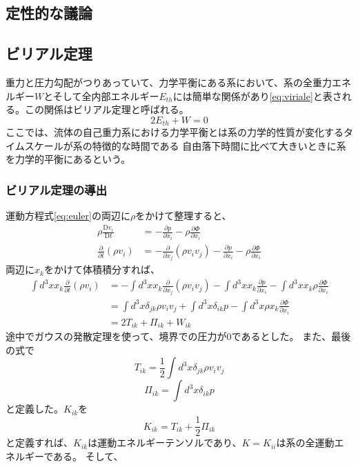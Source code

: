 \documentclass[a4j, dvipdfmx]{jsarticle}
\newcommand{\pder}[2][]{\frac{\partial#1}{\partial#2}}
\newcommand{\Dder}[2][]{\frac{\mathrm{D}#1}{\mathrm{D}#2}}
\newcommand{\half}{\frac{1}{2}}
\newcommand{\beq}{\begin{equation}}
\newcommand{\eeq}{\end{equation}}
\begin{document}
\subsection{定性的な議論}
\subsection{ビリアル定理}
重力と圧力勾配がつりあっていて、力学平衡にある系において、系の全重力エネルギー$W$とそして全内部エネルギー$E_{th}$には簡単な関係があり\eqref{eq:viriale}と表される。この関係はビリアル定理と呼ばれる。
\begin{equation}
    2E_{th} + W = 0\label{eq:viriale}
\end{equation}
ここでは、流体の自己重力系における力学平衡とは系の力学的性質が変化するタイムスケールが系の特徴的な時間である
自由落下時間に比べて大きいときに系を力学的平衡にあるという。
\subsubsection{ビリアル定理の導出}
運動方程式\eqref{eq:euler}の両辺に$\rho$をかけて整理すると、
\begin{align}
    \rho\Dder[v_i]{t} &= - \pder[p]{x_i} - \rho\pder[\Phi]{x_i}\\
    \pder[]{t}(\rho v_i) &= - \pder[]{x_j}(\rho v_iv_j) - \pder[p]{x_i} - \rho\pder[\Phi]{x_i}
\end{align}
両辺に$x_k$をかけて体積積分すれば、
\begin{align}
    \int d^3x x_k \pder[]{t}(\rho v_i) &= - \int d^3x x_k\pder[]{x_j}(\rho v_iv_j) - \int d^3x x_k\pder[p]{x_i} - \int d^3x x_k\rho\pder[\Phi]{x_i}\\
                                       &=  \int d^3x \delta_{jk}\rho v_iv_j + \int d^3x \delta_{ik}p - \int d^3x \rho x_k\pder[\Phi]{x_i}\label{eq:pzero}\\
                                       &= 2T_{ik} + \Pi_{ik} + W_{ik}
\end{align}
途中でガウスの発散定理を使って、境界での圧力が$0$であるとした。
また、最後の式で
\beq
T_{ik} = \half\int d^3x \delta_{jk}\rho v_iv_j
\eeq
\beq
 \Pi_{ik} =  \int d^3x \delta_{ik}p
\eeq
と定義した。$K_{ik}$を
\beq
K_{ik} = T_{ik} + \half\Pi_{ik}
\eeq
と定義すれば、$K_{ik}$は運動エネルギーテンソルであり、$K = K_{ii}$は系の全運動エネルギーである。
そして、
\end{document}
